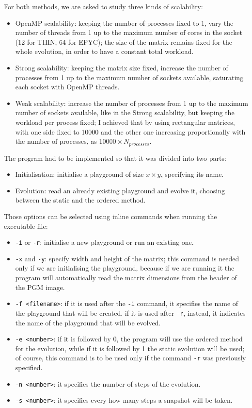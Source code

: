 \documentclass[12pt]{article}
\begin{document}
    For both methods, we are asked to study three kinds of scalability:
    \begin{itemize}
        \item OpenMP scalability: keeping the number of processes fixed to 1, vary the number of threads from 1 up to the maximum number of cores in the socket (12 for THIN, 64 for EPYC); the size of the matrix remains fixed for the whole evolution, in order to have a constant total workload.
        \item Strong scalability: keeping the matrix size fixed, increase the number of processes from 1 up to the maximum number of sockets available, saturating each socket with OpenMP threads.
        \item Weak scalability: increase the number of processes from 1 up to the maximum number of sockets available, like in the Strong scalability, but keeping the workload per process fixed; I achieved that by using rectangular matrices, with one side fixed to 10000 and the other one increasing proportionally with the number of processes, as $10000 \times N_{processes}$.
    \end{itemize}

    The program had to be implemented so that it was divided into two parts:
    \begin{itemize}
        \item Initialisation: initialise a playground of size $x \times y$, specifying its name.
        \item Evolution: read an already existing playground and evolve it, choosing between the static and the ordered method.
    \end{itemize}
    Those options can be selected using inline commands when running the executable file:
    \begin{itemize}
        \item \lstinline{-i} or \lstinline{-r}: initialise a new playground or run an existing one.
        \item \lstinline{-x} and \lstinline{-y}: specify width and height of the matrix; this command is needed only if we are initialising the playground, because if we are running it the program will automatically read the matrix dimensions from the header of the PGM image.
        \item \lstinline{-f <filename>}: if it is used after the \lstinline{-i} command, it specifies the name of the playground that will be created. if it is used after \lstinline{-r}, instead, it indicates the name of the playground that will be evolved.
        \item \lstinline{-e <number>}: if it is followed by 0, the program will use the ordered method for the evolution, while if it is followed by 1 the static evolution will be used; of course, this command is to be used only if the command \lstinline{-r} was previously specified.
        \item \lstinline{-n <number>}: it specifies the number of steps of the evolution.
        \item \lstinline{-s <number>}: it specifies every how many steps a snapshot will be taken.
     \end{itemize}
\end{document}
